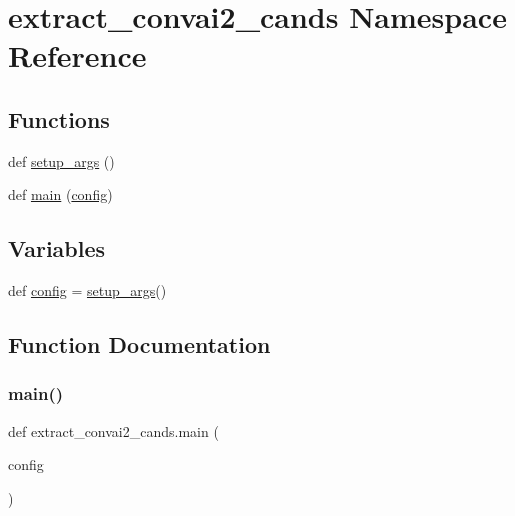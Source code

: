 \hypertarget{namespaceextract__convai2__cands}{}\section{extract\+\_\+convai2\+\_\+cands Namespace Reference}
\label{namespaceextract__convai2__cands}
\subsection*{Functions}
\begin{DoxyCompactItemize}
\item 
def \hyperlink{namespaceextract__convai2__cands_a7f48dc848fff4ab34dc553d70b0874e1}{setup\+\_\+args} ()
\item 
def \hyperlink{namespaceextract__convai2__cands_a404a4600383a8bcc151e2a5090eadaec}{main} (\hyperlink{namespaceextract__convai2__cands_a259117907f3e71d8a7bbcbc7fc95b8a9}{config})
\end{DoxyCompactItemize}
\subsection*{Variables}
\begin{DoxyCompactItemize}
\item 
def \hyperlink{namespaceextract__convai2__cands_a259117907f3e71d8a7bbcbc7fc95b8a9}{config} = \hyperlink{namespaceextract__convai2__cands_a7f48dc848fff4ab34dc553d70b0874e1}{setup\+\_\+args}()
\end{DoxyCompactItemize}


\subsection{Function Documentation}
\mbox{\label{namespaceextract__convai2__cands_a404a4600383a8bcc151e2a5090eadaec}} 
\subsubsection{\texorpdfstring{main()}{main()}}
{\footnotesize\ttfamily def extract\+\_\+convai2\+\_\+cands.\+main (\begin{DoxyParamCaption}\item[{}]{config }\end{DoxyParamCaption})}



